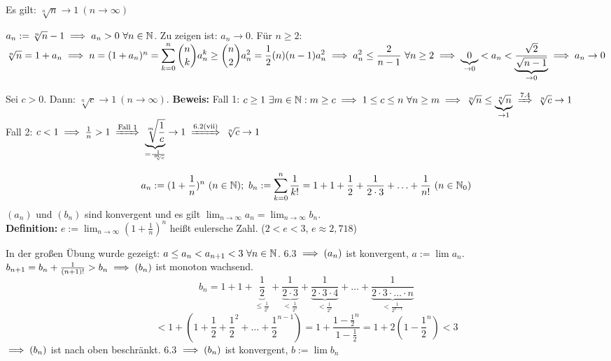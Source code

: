 \documentclass[a4paper,twoside,DIV15,BCOR12mm]{scrbook}
\begin{document}
\begin{satz}
Es gilt: $\sqrt[n]{n} \to 1 \ (n \to \infty)$
\end{satz}

\begin{beweis}
$a_n := \sqrt[n]{n} -1 \folgt a_n > 0 \ \forall n \in\MdN$. Zu zeigen ist: $a_n \to 0$. Für $n \ge 2$: $\sqrt[n]{n} = 1 + a_n \implies n = (1+a_n)^n = \displaystyle\sum_{k=0}^n \binom{n}{k}a_n^k \ge \binom{n}{2}a_n^2 = \frac{1}{2}(n)(n-1)a_n^2 \implies a_n^2 \le \frac{2}{n-1} \ \forall n\ge 2 \implies \underbrace{0}_{\to 0} < a_n < \underbrace{\frac{\sqrt{2}}{\sqrt{n-1}}}_{\to 0} \implies a_n \to 0$
\end{beweis}

\begin{wichtigesbeispiel}
Sei $c>0$. Dann: $\sqrt[n]{c} \to 1 \ (n\to\infty)$.
\textbf{Beweis:} Fall 1: $c\ge 1 \ \exists m \in\MdN: m \ge c \folgt 1\le c\le n \ \forall n\ge m \folgt \sqrt[n]{n} \le \underbrace{\sqrt[n]{n}}_{\to 1} \folgtnach{7.4} \sqrt[n]{c} \to 1$ \\
Fall 2: $c<1 \folgt \frac{1}{n} > 1 \folgtnach{Fall 1} \underbrace{\sqrt[m]{\frac{1}{c}}}_{=\frac{1}{\sqrt[m]{c}}} \to 1 \folgtnach{6.2(vii)} \sqrt[n]{c} \to 1$
\end{wichtigesbeispiel}

\begin{satz}
$$a_n := (1+\frac{1}{n})^n \ (n\in\MdN);\ b_n := \displaystyle\sum_{k=0}^n \frac{1}{k!} = 1 + 1 + \frac{1}{2} + \frac{1}{2\cdot3}+ \ldots + \frac{1}{n!}\ (n\in\MdN_0)$$
$(a_n)$ und $(b_n)$ sind konvergent und es gilt $\displaystyle\lim_{n\to\infty} a_n = \displaystyle\lim_{n\to\infty} b_n$.\\
\textbf{Definition:} $e := \displaystyle\lim_{n\to\infty} (1+\frac{1}{n})^n$ heißt eulersche Zahl. ($2<e<3$, $e\approx 2,718$)
\end{satz}

In der großen Übung wurde gezeigt: $a\le a_n < a_{n+1} < 3\ \forall n\in\mathbb{N}$. 6.3 $\implies(a_n)$ ist konvergent, $a:=\lim a_n$.\\
$b_{n+1} = b_n + \frac{1}{(n+1)!} > b_n \implies (b_n)$ ist monoton wachsend.
$$b_n = 1+ 1+ \underbrace{\frac{1}{2}}_{\le\frac{1}{2^1}} + \underbrace{\frac{1}{2\cdot3}}_{<\frac{1}{2^2}} + \underbrace {\frac{1}{2\cdot 3\cdot 4}}_{< \frac{1}{2^3}}+\ldots+ \underbrace{\frac{1}{2\cdot3\cdot\ldots\cdot n}}_{< \frac{1}{2^{n-1}}} $$
$$ < 1+ (1+ \frac{1}{2} + \frac{1}{2}^2 + \ldots + \frac{1}{2}^{n-1}) = 1+ \frac{1-\frac{1}{2}^n}{1-\frac{1}{2}} = 1+ 2(1-\frac{1}{2}^n) < 3$$
$\implies (b_n)$ ist nach oben beschränkt. 6.3 $\implies (b_n)$ ist konvergent, $b:=\lim b_n$
\end{document}

